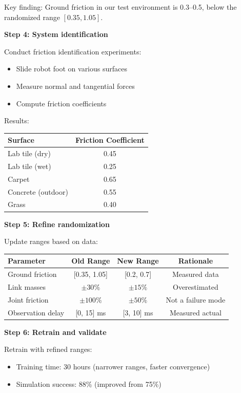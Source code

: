 \begin{example}
Key finding: Ground friction in our test environment is 0.3--0.5, below the randomized range $[0.35, 1.05]$.

\textbf{Step 4: System identification}

Conduct friction identification experiments:
\begin{itemize}
    \item Slide robot foot on various surfaces
    \item Measure normal and tangential forces
    \item Compute friction coefficients
\end{itemize}

Results:
\begin{center}
\begin{tabular}{lc}
\toprule
\textbf{Surface} & \textbf{Friction Coefficient} \\
\midrule
Lab tile (dry) & 0.45 \\
Lab tile (wet) & 0.25 \\
Carpet & 0.65 \\
Concrete (outdoor) & 0.55 \\
Grass & 0.40 \\
\bottomrule
\end{tabular}
\end{center}

\textbf{Step 5: Refine randomization}

Update ranges based on data:
\begin{center}
\begin{tabular}{lccc}
\toprule
\textbf{Parameter} & \textbf{Old Range} & \textbf{New Range} & \textbf{Rationale} \\
\midrule
Ground friction & [0.35, 1.05] & [0.2, 0.7] & Measured data \\
Link masses & $\pm 30\%$ & $\pm 15\%$ & Overestimated \\
Joint friction & $\pm 100\%$ & $\pm 50\%$ & Not a failure mode \\
Observation delay & [0, 15] ms & [3, 10] ms & Measured actual \\
\bottomrule
\end{tabular}
\end{center}

\textbf{Step 6: Retrain and validate}

Retrain with refined ranges:
\begin{itemize}
    \item Training time: 30 hours (narrower ranges, faster convergence)
    \item Simulation success: 88\% (improved from 75\%)
\end{itemize}


\end{example}
